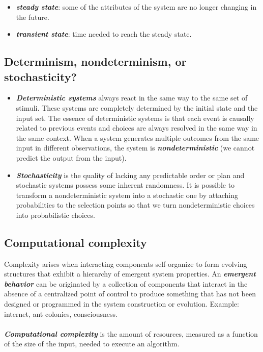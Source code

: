 \begin{itemize}
\tightlist
\item
  \textbf{\emph{steady state}}: some of the attributes of the system are
  no longer changing in the future.
\item
  \textbf{\emph{transient state}}: time needed to reach the steady state.
\end{itemize}


\subsection{Determinism, nondeterminism, or stochasticity?}

\begin{itemize}
\tightlist
\item
  \textbf{\emph{Deterministic systems}} always react in the same way to
  the same set of stimuli. These systems are completely determined by
  the initial state and the input set. The essence of deterministic
  systems is that each event is causally related to previous events and
  choices are always resolved in the same way in the same context. When
  a system generates multiple outcomes from the same input in different
  observations, the system is \textbf{\emph{nondeterministic}} (we
  cannot predict the output from the input).
\item
  \textbf{\emph{Stochasticity}} is the quality of lacking any
  predictable order or plan and stochastic systems possess some inherent
  randomness. It is possible to transform a nondeterministic system into
  a stochastic one by attaching probabilities to the selection points so
  that we turn nondeterministic choices into probabilistic choices.
\end{itemize}


\subsection{Computational complexity}

Complexity arises when interacting components self-organize to form
evolving structures that exhibit a hierarchy of emergent system
properties. An \textbf{\emph{emergent behavior}} can be originated by a
collection of components that interact in the absence of a centralized
point of control to produce something that has not been designed or
programmed in the system construction or evolution. Example: internet,
ant colonies, consciousness.\\
\\
\noindent
\textbf{\emph{Computational complexity}} is the amount of resources,
measured as a function of the size of the input, needed to execute an
algorithm.

